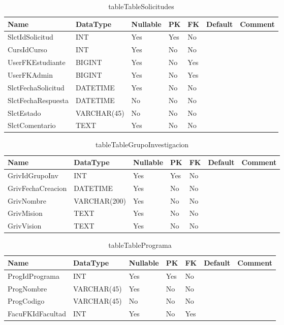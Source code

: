 \begin{table}
	\caption{tableTableSolicitudes}
	\label{labelTableSolicitudes}
	\begin{tabular}{ |l|l|l|l|l|l|l| }
		\hline
		Name & DataType & Nullable & PK & FK & Default & Comment \\ \hline
		SlctIdSolicitud & INT & Yes & Yes & No &  & \\ \hline 
		CursIdCurso & INT & Yes & No & No &  & \\ \hline 
		UserFKEstudiante & BIGINT & Yes & No & Yes &  & \\ \hline 
		UserFKAdmin & BIGINT & Yes & No & Yes &  & \\ \hline 
		SlctFechaSolicitud & DATETIME & Yes & No & No &  & \\ \hline 
		SlctFechaRespuesta & DATETIME & No & No & No &  & \\ \hline 
		SlctEstado & VARCHAR(45) & No & No & No &  & \\ \hline 
		SlctComentario & TEXT & Yes & No & No &  & \\ \hline 
		
	\end{tabular}
\end{table}


\begin{table}
	\caption{tableTableGrupoInvestigacion}
	\label{labelTableGrupoInvestigacion}
	\begin{tabular}{ |l|l|l|l|l|l|l| }
		\hline
		Name & DataType & Nullable & PK & FK & Default & Comment \\ \hline
		GrivIdGrupoInv & INT & Yes & Yes & No &  & \\ \hline 
		GrivFechaCreacion & DATETIME & Yes & No & No &  & \\ \hline 
		GrivNombre & VARCHAR(200) & Yes & No & No &  & \\ \hline 
		GrivMision & TEXT & Yes & No & No &  & \\ \hline 
		GrivVision & TEXT & Yes & No & No &  & \\ \hline 
		
	\end{tabular}
\end{table}


\begin{table}
	\caption{tableTablePrograma}
	\label{labelTablePrograma}
	\begin{tabular}{ |l|l|l|l|l|l|l| }
		\hline
		Name & DataType & Nullable & PK & FK & Default & Comment \\ \hline
		ProgIdPrograma & INT & Yes & Yes & No &  & \\ \hline 
		ProgNombre & VARCHAR(45) & Yes & No & No &  & \\ \hline 
		ProgCodigo & VARCHAR(45) & No & No & No &  & \\ \hline 
		FacuFKIdFacultad & INT & Yes & No & Yes &  & \\ \hline 
		
	\end{tabular}
\end{table}



